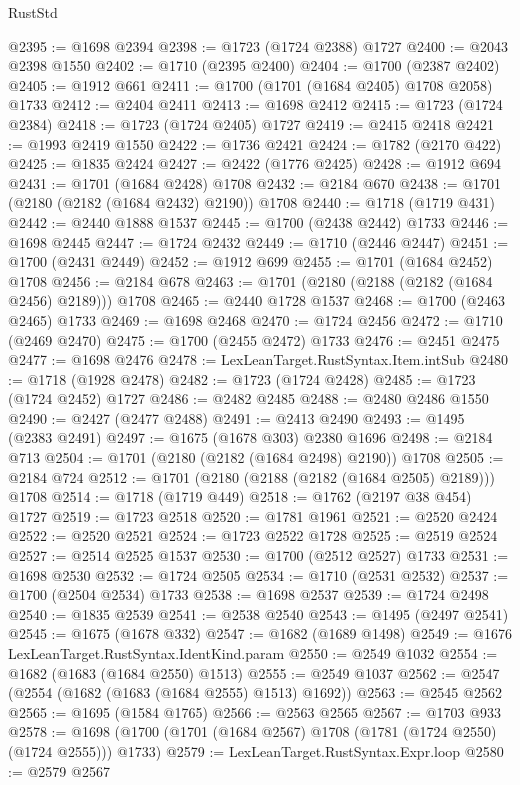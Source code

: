 \begin{lexlean}{RustStd}
\begin{coremodule}
@2395 := @1698 @2394
@2398 := @1723 (@1724 @2388) @1727
@2400 := @2043 @2398 @1550
@2402 := @1710 (@2395 @2400)
@2404 := @1700 (@2387 @2402)
@2405 := @1912 @661
@2411 := @1700 (@1701 (@1684 @2405) @1708 @2058) @1733
@2412 := @2404 @2411
@2413 := @1698 @2412
@2415 := @1723 (@1724 @2384)
@2418 := @1723 (@1724 @2405) @1727
@2419 := @2415 @2418
@2421 := @1993 @2419 @1550
@2422 := @1736 @2421
@2424 := @1782 (@2170 @422)
@2425 := @1835 @2424
@2427 := @2422 (@1776 @2425)
@2428 := @1912 @694
@2431 := @1701 (@1684 @2428) @1708
@2432 := @2184 @670
@2438 := @1701 (@2180 (@2182 (@1684 @2432) @2190)) @1708
@2440 := @1718 (@1719 @431)
@2442 := @2440 @1888 @1537
@2445 := @1700 (@2438 @2442) @1733
@2446 := @1698 @2445
@2447 := @1724 @2432
@2449 := @1710 (@2446 @2447)
@2451 := @1700 (@2431 @2449)
@2452 := @1912 @699
@2455 := @1701 (@1684 @2452) @1708
@2456 := @2184 @678
@2463 := @1701 (@2180 (@2188 (@2182 (@1684 @2456) @2189))) @1708
@2465 := @2440 @1728 @1537
@2468 := @1700 (@2463 @2465) @1733
@2469 := @1698 @2468
@2470 := @1724 @2456
@2472 := @1710 (@2469 @2470)
@2475 := @1700 (@2455 @2472) @1733
@2476 := @2451 @2475
@2477 := @1698 @2476
@2478 := LexLeanTarget.RustSyntax.Item.intSub
@2480 := @1718 (@1928 @2478)
@2482 := @1723 (@1724 @2428)
@2485 := @1723 (@1724 @2452) @1727
@2486 := @2482 @2485
@2488 := @2480 @2486 @1550
@2490 := @2427 (@2477 @2488)
@2491 := @2413 @2490
@2493 := @1495 (@2383 @2491)
@2497 := @1675 (@1678 @303) @2380 @1696
@2498 := @2184 @713
@2504 := @1701 (@2180 (@2182 (@1684 @2498) @2190)) @1708
@2505 := @2184 @724
@2512 := @1701 (@2180 (@2188 (@2182 (@1684 @2505) @2189))) @1708
@2514 := @1718 (@1719 @449)
@2518 := @1762 (@2197 @38 @454) @1727
@2519 := @1723 @2518
@2520 := @1781 @1961
@2521 := @2520 @2424
@2522 := @2520 @2521
@2524 := @1723 @2522 @1728
@2525 := @2519 @2524
@2527 := @2514 @2525 @1537
@2530 := @1700 (@2512 @2527) @1733
@2531 := @1698 @2530
@2532 := @1724 @2505
@2534 := @1710 (@2531 @2532)
@2537 := @1700 (@2504 @2534) @1733
@2538 := @1698 @2537
@2539 := @1724 @2498
@2540 := @1835 @2539
@2541 := @2538 @2540
@2543 := @1495 (@2497 @2541)
@2545 := @1675 (@1678 @332)
@2547 := @1682 (@1689 @1498)
@2549 := @1676 LexLeanTarget.RustSyntax.IdentKind.param
@2550 := @2549 @1032
@2554 := @1682 (@1683 (@1684 @2550) @1513)
@2555 := @2549 @1037
@2562 := @2547 (@2554 (@1682 (@1683 (@1684 @2555) @1513) @1692))
@2563 := @2545 @2562
@2565 := @1695 (@1584 @1765)
@2566 := @2563 @2565
@2567 := @1703 @933
@2578 := @1698 (@1700 (@1701 (@1684 @2567) @1708 (@1781 (@1724 @2550) (@1724 @2555))) @1733)
@2579 := LexLeanTarget.RustSyntax.Expr.loop
@2580 := @2579 @2567

\end{coremodule}
\end{lexlean}
